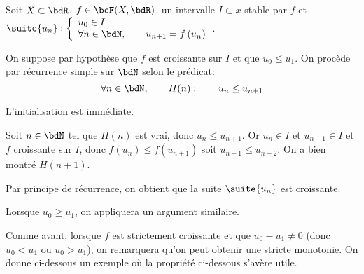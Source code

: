 \documentclass[a4paper,french,bookmarks]{article}
\begin{document}
\begin{nproof}
    Soit $X \subset \bdR$, $f \in \bcF(X, \bdR)$, un intervalle $I \subset x$ stable par $f$ et $\suite{u_n} : \left\lbrace\begin{array}{l}
        u_0 \in I  \\
        \forall n \in \bdN,\qquad u_{n+1} = f\left(u_n\right) 
    \end{array}\right.$.
    
    On suppose par hypothèse que $f$ est croissante sur $I$ et que $u_0 \leq u_1$. On procède par récurrence simple sur $\bdN$ selon le prédicat:
    \[ \forall n \in \bdN,\qquad H(n): \qquad u_n \leq u_{n+1} \]
    \begin{enumerate}
        \itt L'initialisation est immédiate.
        
        \itt Soit $n \in \bdN$ tel que $H(n)$ est vrai, donc $u_n \leq u_{n+1}$. Or $u_n \in I$ et $u_{n+1} \in I$ et $f$ croissante sur $I$, donc $f\left(u_n\right) \leq f\left(u_{n+1}\right)$ soit $u_{n+1} \leq u_{n+2}$. On a bien montré $H(n+1)$.
        
        \itt Par principe de récurrence, on obtient que la suite $\suite{u_n}$ est croissante.
    \end{enumerate}
    Lorsque $u_0 \geq u_1$, on appliquera un argument similaire.
\end{nproof}
%
Comme avant, lorsque $f$ est strictement croissante et que $u_0 - u_1 \neq 0$ (donc $u_0 < u_1$ ou $u_0 > u_1$), on remarquera qu'on peut obtenir une stricte monotonie. On donne ci-dessous un exemple où la propriété ci-dessous s'avère utile.
\end{document}

